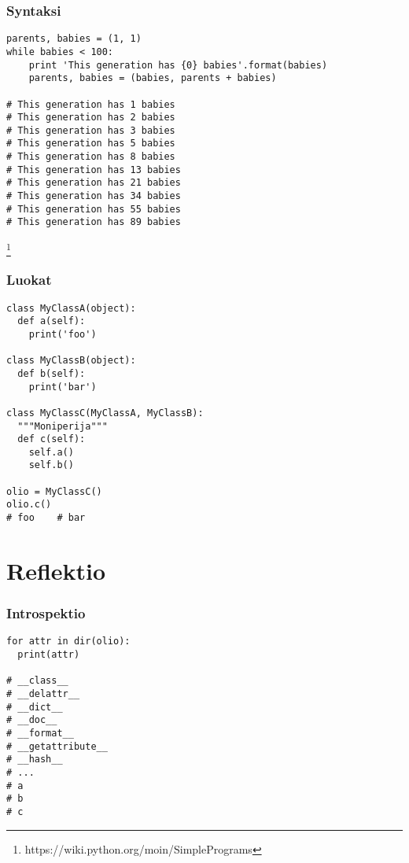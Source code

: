 \documentclass{beamer}
\newcommand\blfootnote[1]{%
  \begingroup
  \renewcommand\thefootnote{}\footnote{#1}%
  \addtocounter{footnote}{-1}%
  \endgroup
}
\begin{document}
\begin{frame}[fragile]
\frametitle{Syntaksi}
\begin{verbatim}
parents, babies = (1, 1)
while babies < 100:
    print 'This generation has {0} babies'.format(babies)
    parents, babies = (babies, parents + babies)

# This generation has 1 babies
# This generation has 2 babies
# This generation has 3 babies
# This generation has 5 babies
# This generation has 8 babies
# This generation has 13 babies
# This generation has 21 babies
# This generation has 34 babies
# This generation has 55 babies
# This generation has 89 babies
\end{verbatim}
\blfootnote{https://wiki.python.org/moin/SimplePrograms}
\end{frame}




\begin{frame}[fragile]
\frametitle{Luokat}
\begin{verbatim}
class MyClassA(object):
  def a(self):
    print('foo')

class MyClassB(object):
  def b(self):
    print('bar')

class MyClassC(MyClassA, MyClassB):
  """Moniperija"""
  def c(self):
    self.a()
    self.b()

olio = MyClassC()
olio.c()
# foo    # bar
\end{verbatim}
\end{frame}

\section{Reflektio}

\begin{frame}[fragile]
\frametitle{Introspektio}
\begin{verbatim}
for attr in dir(olio): 
  print(attr)

# __class__
# __delattr__
# __dict__
# __doc__
# __format__
# __getattribute__
# __hash__
# ...
# a
# b
# c
\end{verbatim}
\end{frame}
\end{document}
